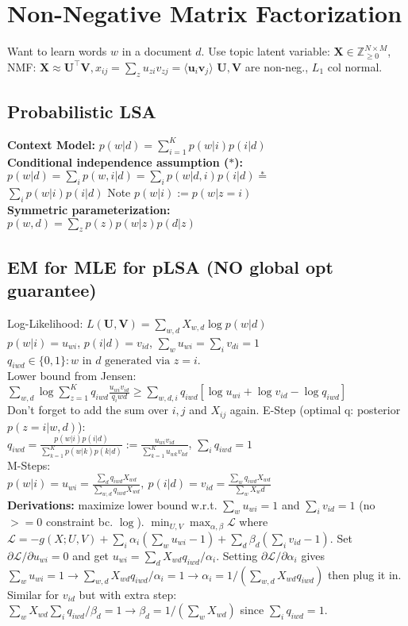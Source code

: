 \section*{Non-Negative Matrix Factorization}
Want to learn words $w$ in a document $d$. Use topic latent variable: 
$\mathbf{X} \in \mathbb{Z}^{N \times M}_{\geq 0}$, NMF: $\mathbf{X} \approx \mathbf{U^\top V}, x_{ij}=\sum_z{u_{zi}v_{zj}}=\langle\mathbf{u}_i \mathbf{v}_j\rangle$
$\mathbf{U},\mathbf{V}$ are non-neg., $L_1$ col normal.
\subsection*{Probabilistic LSA}
\textbf{Context Model:} $p(w | d) = \sum_{i=1}^K p(w | i) p(i | d)$\\
\textbf{Conditional independence assumption ($*$):}\\
$p(w|d) = \sum_i p(w,i|d) = \sum_i p(w|d,i)p(i|d) \stackrel{*}{=}$\\$\sum_i p(w|i)p(i|d)$ \quad Note $p(w|i):=p(w|z=i)$\\
\textbf{Symmetric parameterization:}\\
$p(w, d) = \sum_z p(z)p(w | z) p(d | z)$
\subsection*{EM for MLE for pLSA (NO global opt guarantee)}
Log-Likelihood: $L(\mathbf{U}, \mathbf{V}) = \sum_{w,d} X_{w,d}\log p(w|d)$ \\
$ p(w|i) = u_{wi}$, $p(i|d) = v_{id}$, $\sum_w u_{wi} = \sum_i v_{di} = 1$\\
$q_{iwd} \in \{0,1\}: w \text{ in } d \text{ generated via } z=i$. \\
Lower bound from Jensen: $\sum_{w,d}\log \sum_{z=1}^K q_{iwd} \frac{u_{wi}v_{id}}{q_iwd} \geq \sum_{w,d,i} q_{iwd} [\log u_{wi} + \log v_{id} - \log q_{iwd}]$\\
Don't forget to add the sum over $i,j$ and $X_{ij}$ again.
E-Step (optimal q: posterior $p(z=i|w,d)$):\\
$q_{iwd} = \frac{p(w|i)p(i|d)}{\sum_{k=1}^K p(w|k)p(k|d)} := \frac{u_{wi}v_{id}}{\sum_{k=1}^K u_{wk}v_{kd}}$, $\sum_i q_{iwd}=1$\\
M-Steps:\\
$p(w|i)=u_{wi} = \frac{\sum_d q_{iwd}X_{wd}}{\sum_{w,d}q_{iwd}X_{wd}}, \ 
p(i|d)=v_{id} = \frac{\sum_w q_{iwd}X_{wd}}{\sum_{w}X_wd}$ \\
\textbf{Derivations:} maximize lower bound w.r.t. $\sum_w u_{wi}=1$ and $\sum_i v_{id}=1$ (no $>=0$ constraint bc. $\log$). $\min_{U,V} \max_{\alpha, \beta}\mathcal{L}$ where $\mathcal{L} = -g(X; U, V) + \sum_i \alpha_i(\sum_w u_{wi} - 1) + \sum_d \beta_d (\sum_i v_{id} - 1)$. Set $\partial \mathcal{L} / \partial u_{wi} = 0$ and get $u_{wi} = \sum_d X_{wd}q_{iwd}/\alpha_i$. Setting $\partial \mathcal{L}/\partial \alpha_i$ gives $\sum_w u_{wi} = 1 \to \sum_{w,d} X_{wd} q_{iwd} / \alpha_i = 1 \to \alpha_i = 1 / (\sum_{w,d} X_{wd} q_{iwd})$ then plug it in. Similar for $v_{id}$ but with extra step: $\sum_w X_{wd} \sum_i q_{iwd} / \beta_d = 1 \to \beta_d = 1/(\sum_w X_{wd})$ since $\sum_i q_{iwd}=1$.
 
